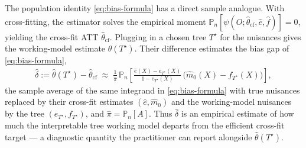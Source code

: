 \documentclass[11pt]{article}
\theoremstyle{plain}
\theoremstyle{remark}
\newcommand{\PP}{\mathbb{P}}
\begin{document}
The population identity \eqref{eq:bias-formula} has a direct sample analogue.
With cross-fitting, the estimator solves the empirical moment
$\PP_n[\psi(O; \hat\theta_{\mathrm{cf}}, \hat e, \hat f)] = 0$, yielding the
cross-fit ATT $\hat\theta_{\mathrm{cf}}$. Plugging in a chosen tree $T^\star$ for
the nuisances gives the working-model estimate $\hat\theta(T^\star)$. Their
difference estimates the bias gap of \eqref{eq:bias-formula},
\begin{align*}
  \hat\delta
  := \hat\theta(T^\star) - \hat\theta_{\mathrm{cf}}
  \;\approx\;
  \frac{1}{\hat\pi}\,
  \PP_n\!\left[
    \frac{\hat e(X) - e_{T^\star}(X)}{1 - e_{T^\star}(X)}\,
    \bigl(\hat m_0(X) - f_{T^\star}(X)\bigr)
  \right],
\end{align*}
the sample average of the same integrand in \eqref{eq:bias-formula} with true
nuisances replaced by their cross-fit estimates $(\hat e, \hat m_0)$ and the
working-model nuisances by the tree $(e_{T^\star}, f_{T^\star})$, and
$\hat\pi = \PP_n[A]$. Thus $\hat\delta$ is an empirical estimate of how much the
interpretable tree working model departs from the efficient cross-fit target ---
a diagnostic quantity the practitioner can report alongside $\hat\theta(T^\star)$.
\end{document}
